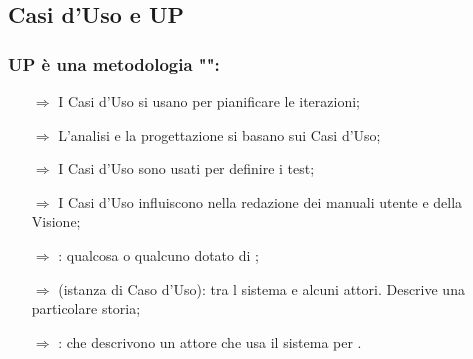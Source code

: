 \subsection{Casi d'Uso e UP}

\subsubsection{UP è una metodologia "":}
\begin{itemize}
    \item [$\Rightarrow$] I Casi d'Uso si usano per pianificare le iterazioni;
    \item [$\Rightarrow$] L'analisi e la progettazione si basano sui Casi d'Uso;
    \item [$\Rightarrow$] I Casi d'Uso sono usati per definire i test;
    \item [$\Rightarrow$] I Casi d'Uso influiscono nella redazione dei manuali utente e della Visione;
    \item [$\Rightarrow$] : qualcosa o qualcuno dotato di ;
    \item [$\Rightarrow$]  (istanza di Caso d'Uso):  tra l sistema e alcuni attori. Descrive una particolare storia;
    \item [$\Rightarrow$] :  che descrivono un attore che usa il sistema per .
\end{itemize}


\pagebreak
{}


